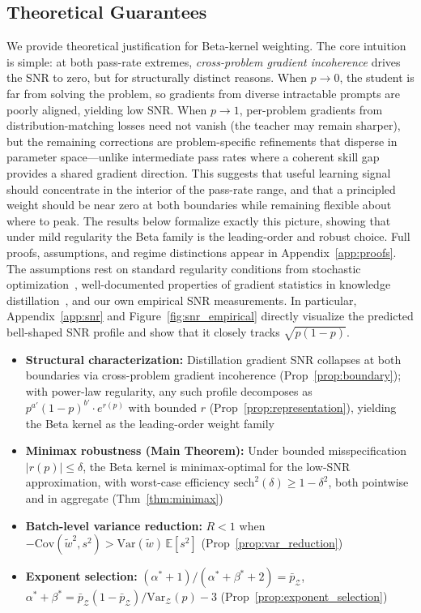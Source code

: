 \documentclass{article}
\begin{document}
\subsection{Theoretical Guarantees}
\label{sec:theory}
We provide theoretical justification for Beta-kernel weighting. The core intuition is simple: at both pass-rate extremes, \emph{cross-problem gradient incoherence} drives the SNR to zero, but for structurally distinct reasons. When $p \to 0$, the student is far from solving the problem, so gradients from diverse intractable prompts are poorly aligned, yielding low SNR. When $p \to 1$, per-problem gradients from distribution-matching losses need not vanish (the teacher may remain sharper), but the remaining corrections are problem-specific refinements that disperse in parameter space---unlike intermediate pass rates where a coherent skill gap provides a shared gradient direction. This suggests that useful learning signal should concentrate in the interior of the pass-rate range, and that a principled weight should be near zero at both boundaries while remaining flexible about where to peak. The results below formalize exactly this picture, showing that under mild regularity the Beta family is the leading-order and robust choice. Full proofs, assumptions, and regime distinctions appear in Appendix~\ref{app:proofs}. The assumptions rest on standard regularity conditions from stochastic optimization~\citep{ghadimi2013sgd, bottou2018optimization}, well-documented properties of gradient statistics in knowledge distillation~\citep{tang2020understanding, sankararaman2020gradient, agarwal2022vog}, and our own empirical SNR measurements. In particular, Appendix~\ref{app:snr} and Figure~\ref{fig:snr_empirical} directly visualize the predicted bell-shaped SNR profile and show that it closely tracks $\sqrt{p(1-p)}$.
\begin{resultbox}
\begin{itemize}
\item \textbf{Structural characterization:} Distillation gradient SNR collapses at both boundaries via cross-problem gradient incoherence (Prop~\ref{prop:boundary}); with power-law regularity, any such profile decomposes as $p^{a'}(1{-}p)^{b'} \cdot e^{r(p)}$ with bounded $r$ (Prop~\ref{prop:representation}), yielding the Beta kernel as the leading-order weight family
\item \textbf{Minimax robustness (Main Theorem):} Under bounded misspecification $|r(p)| \leq \delta$, the Beta kernel is minimax-optimal for the low-SNR approximation, with worst-case efficiency $\text{sech}^2(\delta) \geq 1 - \delta^2$, both pointwise and in aggregate (Thm~\ref{thm:minimax})
\item \textbf{Batch-level variance reduction:} $R < 1$ when $-\text{Cov}(\tilde{w}^2, s^2) > \text{Var}(\tilde{w})\,\mathbb{E}[s^2]$ (Prop~\ref{prop:var_reduction})
\item \textbf{Exponent selection:} $(\alpha^*{+}1)/(\alpha^*{+}\beta^*{+}2) = \bar{p}_{\mathcal{Z}}$, $\alpha^*{+}\beta^* = \bar{p}_{\mathcal{Z}}(1{-}\bar{p}_{\mathcal{Z}})/\text{Var}_{\mathcal{Z}}(p) - 3$ (Prop~\ref{prop:exponent_selection})
\end{itemize}
\end{resultbox}
\end{document}
